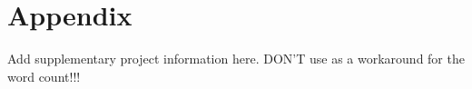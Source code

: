 \section{Appendix}

\noindent Add supplementary project information here. DON'T use as a workaround for the word count!!!